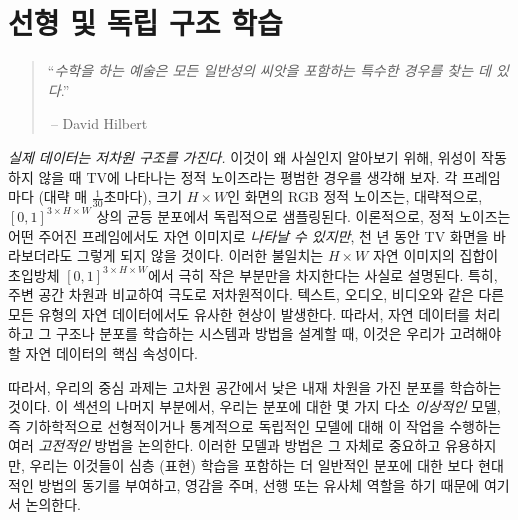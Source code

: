 \documentclass[../../book-main_ko.tex]{subfiles}
\begin{document}
\chapter{선형 및 독립 구조 학습}
\label{ch:classic}\label{ch:linear-independent}

\begin{quote}
\hfill  ``{\em 수학을 하는 예술은 모든 일반성의 씨앗을 포함하는 특수한 경우를 찾는 데 있다}.''


$~$\hfill -- David Hilbert
\end{quote}
\vspace{5mm}







\textit{실제 데이터는 저차원 구조를 가진다.} 이것이 왜 사실인지 알아보기 위해, 위성이 작동하지 않을 때 TV에 나타나는 정적 노이즈라는 평범한 경우를 생각해 보자. 각 프레임마다 (대략 매 \(\frac{1}{30}\)초마다), 크기 \(H \times W\)인 화면의 RGB 정적 노이즈는, 대략적으로, \([0, 1]^{3 \times H \times W}\) 상의 균등 분포에서 독립적으로 샘플링된다. 이론적으로, 정적 노이즈는 어떤 주어진 프레임에서도 자연 이미지로 \textit{나타날 수 있지만}, 천 년 동안 TV 화면을 바라보더라도 그렇게 되지 않을 것이다. 이러한 불일치는 \(H \times W\) 자연 이미지의 집합이 초입방체 \([0, 1]^{3 \times H \times W}\)에서 극히 작은 부분만을 차지한다는 사실로 설명된다. 특히, 주변 공간 차원과 비교하여 극도로 저차원적이다. 텍스트, 오디오, 비디오와 같은 다른 모든 유형의 자연 데이터에서도 유사한 현상이 발생한다. 따라서, 자연 데이터를 처리하고 그 구조나 분포를 학습하는 시스템과 방법을 설계할 때, 이것은 우리가 고려해야 할 자연 데이터의 핵심 속성이다. %

따라서, 우리의 중심 과제는 고차원 공간에서 낮은 내재 차원을 가진 분포를 학습하는 것이다. 이 섹션의 나머지 부분에서, 우리는 분포에 대한 몇 가지 다소 {\em 이상적인} 모델, 즉 기하학적으로 선형적이거나 통계적으로 독립적인 모델에 대해 이 작업을 수행하는 여러 \textit{고전적인} 방법을 논의한다. 이러한 모델과 방법은 그 자체로 중요하고 유용하지만, 우리는 이것들이 심층 (표현) 학습을 포함하는 더 일반적인 분포에 대한 보다 현대적인 방법의 동기를 부여하고, 영감을 주며, 선행 또는 유사체 역할을 하기 때문에 여기서 논의한다.
\end{document}

